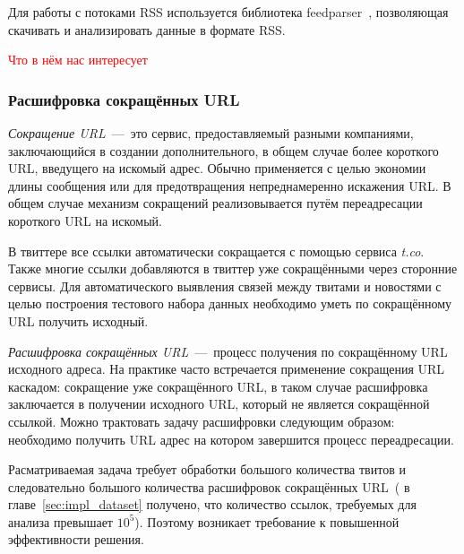         Для работы с потоками RSS используется библиотека feedparser~\cite{feedparser}, позволяющая скачивать и анализировать данные в формате RSS.

        \textcolor{red}{Что в нём нас интересует}

    \subsubsection{Расшифровка сокращённых URL}
        \textit{Сокращение URL}~---~это сервис, предоставляемый разными компаниями, заключающийся в создании дополнительного, в общем случае более короткого URL, введущего на искомый адрес.
        Обычно применяется с целью экономии длины сообщения или для предотвращения непреднамеренно искажения URL.
        В общем случае механизм сокращений реализовывается путём переадресации короткого URL на искомый.

        В твиттере все ссылки автоматически сокращается с помощью сервиса \textit{t.co}. Также многие ссылки добавляются в твиттер уже сокращёнными через сторонние сервисы.
        Для автоматического выявления связей между твитами и новостями с целью построения тестового набора данных необходимо уметь по сокращённому URL получить исходный.

        \textit{Расшифровка сокращённых URL}~---~процесс получения по сокращённому URL исходного адреса.
        На практике часто встречается применение сокращения URL каскадом: сокращение уже сокращённого URL,
        в таком случае расшифровка заключается в получении исходного URL, который не является сокращённой ссылкой.
        Можно трактовать задачу расшифровки следующим образом: необходимо получить URL адрес на котором завершится процесс переадресации.

        Расматриваемая задача требует обработки большого количества твитов и следовательно большого количества расшифровок сокращённых URL~(
        в главе~\ref{sec:impl_dataset} получено, что количество ссылок, требуемых для анализа превышает $10^5$).
        Поэтому возникает требование к повышенной эффективности решения.

